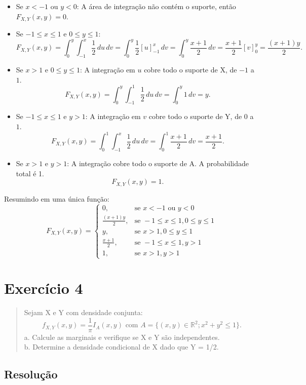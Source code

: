 \documentclass[12pt]{article}
\begin{document}
\begin{itemize}
    \item Se $x < -1$ ou $y < 0$: A área de integração não contém o suporte, então $F_{X,Y}(x,y) = 0$.
    \item Se $-1 \le x \le 1$ e $0 \le y \le 1$:
    \[ F_{X,Y}(x,y) = \int_{0}^{y} \int_{-1}^{x} \frac{1}{2} \,du \,dv = \int_{0}^{y} \frac{1}{2}[u]_{-1}^{x} \,dv = \int_{0}^{y} \frac{x+1}{2} \,dv = \frac{x+1}{2}[v]_{0}^{y} = \frac{(x+1)y}{2}. \]
    \item Se $x > 1$ e $0 \le y \le 1$: A integração em $u$ cobre todo o suporte de X, de $-1$ a $1$.
    \[ F_{X,Y}(x,y) = \int_{0}^{y} \int_{-1}^{1} \frac{1}{2} \,du \,dv = \int_{0}^{y} 1 \,dv = y. \]
    \item Se $-1 \le x \le 1$ e $y > 1$: A integração em $v$ cobre todo o suporte de Y, de $0$ a $1$.
    \[ F_{X,Y}(x,y) = \int_{0}^{1} \int_{-1}^{x} \frac{1}{2} \,du \,dv = \int_{0}^{1} \frac{x+1}{2} \,dv = \frac{x+1}{2}. \]
    \item Se $x > 1$ e $y > 1$: A integração cobre todo o suporte de A. A probabilidade total é 1.
    \[ F_{X,Y}(x,y) = 1. \]
\end{itemize}
Resumindo em uma única função:
\[ F_{X,Y}(x,y) = \begin{cases}
0, & \text{se } x < -1 \text{ ou } y < 0 \\
\frac{(x+1)y}{2}, & \text{se } -1 \le x \le 1, 0 \le y \le 1 \\
y, & \text{se } x > 1, 0 \le y \le 1 \\
\frac{x+1}{2}, & \text{se } -1 \le x \le 1, y > 1 \\
1, & \text{se } x > 1, y > 1
\end{cases} \]

\pagebreak

\section{Exercício 4}

\begin{quote}
Sejam X e Y com densidade conjunta:
\[ f_{X,Y}(x,y) = \frac{1}{\pi} I_A(x,y) \text{ com } A = \{(x,y) \in \mathbb{R}^2; x^2+y^2 \le 1\}. \]
a. Calcule as marginais e verifique se X e Y são independentes. \\
b. Determine a densidade condicional de X dado que Y = 1/2.
\end{quote}

\subsection*{Resolução}
\end{document}
